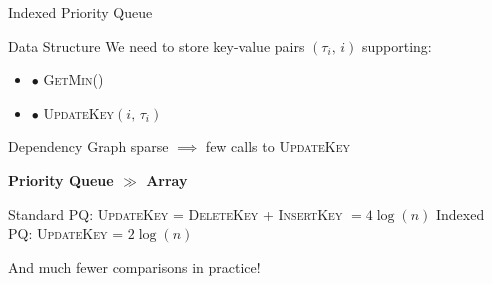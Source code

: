 \documentclass{beamer}
\begin{document}
\begin{frame}{Indexed Priority Queue}
  \begin{block}{Data Structure}
    We need to store key-value pairs $\left(\tau_i,\, i\right)$ supporting:
    \begin{itemize}
    \item $\bullet$ \textsc{GetMin}()
    \item $\bullet$ \textsc{UpdateKey}$\left(i, \, \tau_i\right)$
    \end{itemize}
  \end{block}
  \vspace{5pt}
  \pause
  Dependency Graph sparse $\implies$ few calls to \textsc{UpdateKey}
  \begin{center}
    \textbf{Priority Queue $\pmb{\gg}$ Array}
  \end{center}
  Standard PQ: \textsc{UpdateKey} = \textsc{DeleteKey} + \textsc{InsertKey} $= 4\log(n)$
  Indexed PQ: \textsc{UpdateKey} = $2\log(n)$ \\
  \begin{center}
    And much fewer comparisons in practice!
  \end{center}

\end{frame}
\end{document}
